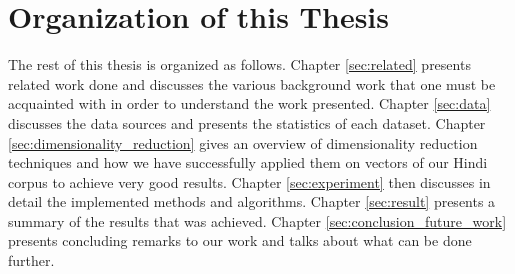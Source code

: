 \section{Organization of this Thesis}
The rest of this thesis is organized as follows. Chapter \ref{sec:related} presents related work done and discusses the various background work that one must be acquainted with in order to understand the work presented. Chapter \ref{sec:data} discusses the data sources and presents the statistics of each dataset. Chapter \ref{sec:dimensionality_reduction} gives an overview of dimensionality reduction techniques and how we have successfully applied them on vectors of our Hindi corpus to achieve very good results. Chapter \ref{sec:experiment} then discusses in detail the implemented methods and algorithms. Chapter \ref{sec:result} presents a summary of the results that was achieved. Chapter \ref{sec:conclusion_future_work} presents concluding remarks to our work and talks about what can be done further.
